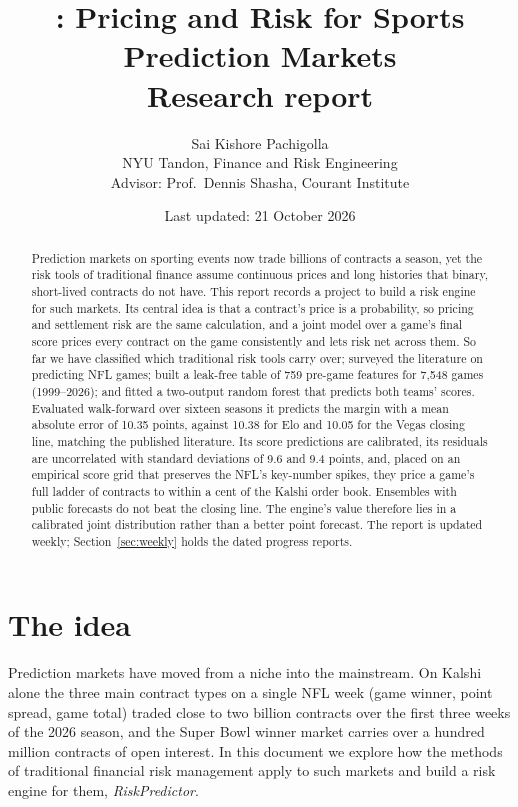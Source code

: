 \documentclass[11pt]{article}
\title{\aname: Pricing and Risk for Sports Prediction Markets\\[4pt]\large Research report}
\author{Sai Kishore Pachigolla\\ \small NYU Tandon, Finance and Risk Engineering \\ \small Advisor: Prof.\ Dennis Shasha, Courant Institute}
\date{Last updated: 21 October 2026}
\newcommand{\aname}{\textit{RiskPredictor}}
\begin{document}
\maketitle

\begin{abstract}
\noindent Prediction markets on sporting events now trade billions of contracts a season, yet the risk tools of traditional finance assume continuous prices and long histories that binary, short-lived contracts do not have. This report records a project to build a risk engine for such markets. Its central idea is that a contract's price is a probability, so pricing and settlement risk are the same calculation, and a joint model over a game's final score prices every contract on the game consistently and lets risk net across them. So far we have classified which traditional risk tools carry over; surveyed the literature on predicting NFL games; built a leak-free table of 759 pre-game features for 7,548 games (1999--2026); and fitted a two-output random forest that predicts both teams' scores. Evaluated walk-forward over sixteen seasons it predicts the margin with a mean absolute error of 10.35 points, against 10.38 for Elo and 10.05 for the Vegas closing line, matching the published literature. Its score predictions are calibrated, its residuals are uncorrelated with standard deviations of 9.6 and 9.4 points, and, placed on an empirical score grid that preserves the NFL's key-number spikes, they price a game's full ladder of contracts to within a cent of the Kalshi order book. Ensembles with public forecasts do not beat the closing line. The engine's value therefore lies in a calibrated joint distribution rather than a better point forecast. The report is updated weekly; Section~\ref{sec:weekly} holds the dated progress reports.
\end{abstract}

\tableofcontents

\section{The idea}\label{sec:idea}


Prediction markets have moved from a niche into the mainstream. On Kalshi alone the three main contract types on a single NFL week (game winner, point spread, game total) traded close to two billion contracts over the first three weeks of the 2026 season, and the Super Bowl winner market carries over a hundred million contracts of open interest. In this document we explore how the methods of traditional financial risk management apply to such markets and build a risk engine for them, \aname.
\end{document}
